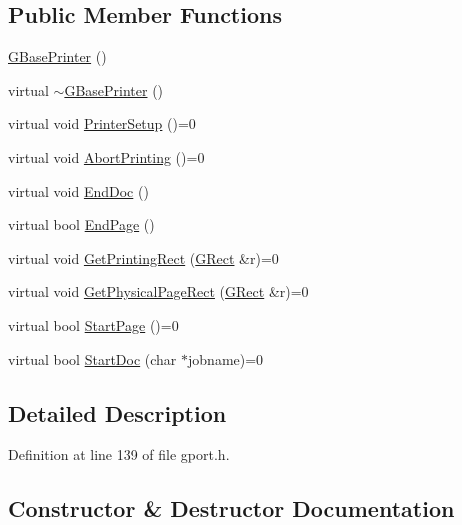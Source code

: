 \subsection*{Public Member Functions}
\begin{DoxyCompactItemize}
\item 
\mbox{\hyperlink{class_g_base_printer_a070f83a6278ff1ac167a13802380b721}{G\+Base\+Printer}} ()
\item 
virtual \mbox{\hyperlink{class_g_base_printer_a6d7e3c06b0131a5e3ed20b717c01ef82}{$\sim$\+G\+Base\+Printer}} ()
\item 
virtual void \mbox{\hyperlink{class_g_base_printer_a477d35154512e2c96971cf6bff8d3274}{Printer\+Setup}} ()=0
\item 
virtual void \mbox{\hyperlink{class_g_base_printer_a09ba32c950923f9b69a704a61652de6a}{Abort\+Printing}} ()=0
\item 
virtual void \mbox{\hyperlink{class_g_base_printer_a98944a13eee52ae3fdbced5c7a317da6}{End\+Doc}} ()
\item 
virtual bool \mbox{\hyperlink{class_g_base_printer_a3572e5164e69c0abcdb304a8b5f7ef5e}{End\+Page}} ()
\item 
virtual void \mbox{\hyperlink{class_g_base_printer_ad8008bef5f9aeed47354dcf4497ce450}{Get\+Printing\+Rect}} (\mbox{\hyperlink{class_g_rect}{G\+Rect}} \&r)=0
\item 
virtual void \mbox{\hyperlink{class_g_base_printer_ab65d45881c40fbceca3c88b7b8f86800}{Get\+Physical\+Page\+Rect}} (\mbox{\hyperlink{class_g_rect}{G\+Rect}} \&r)=0
\item 
virtual bool \mbox{\hyperlink{class_g_base_printer_a5c49511be188949312141af0b797ceba}{Start\+Page}} ()=0
\item 
virtual bool \mbox{\hyperlink{class_g_base_printer_ac0052d2a156a45547cb23781500424c3}{Start\+Doc}} (char $\ast$jobname)=0
\end{DoxyCompactItemize}


\subsection{Detailed Description}


Definition at line 139 of file gport.\+h.



\subsection{Constructor \& Destructor Documentation}
\mbox{\label{class_g_base_printer_a070f83a6278ff1ac167a13802380b721}} 
